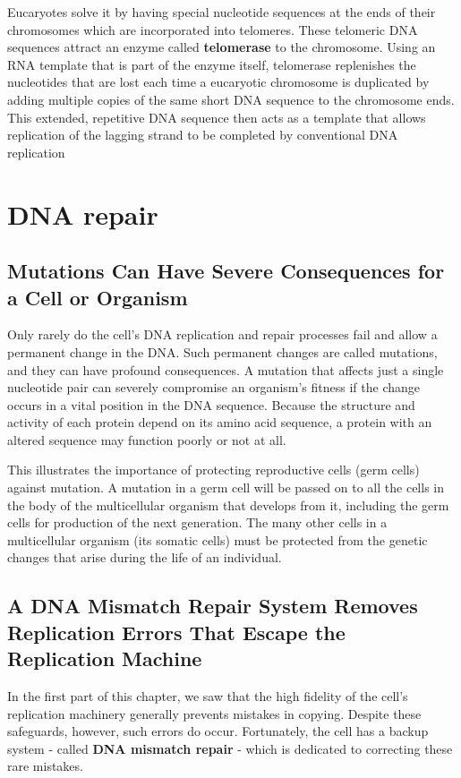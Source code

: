 Eucaryotes solve it by having special nucleotide
sequences at the ends of their chromosomes which are incorporated
into telomeres. These telomeric DNA sequences attract an enzyme called
\textbf{telomerase} to the chromosome. Using an RNA template that is part of
the enzyme itself, telomerase replenishes the nucleotides that are lost
each time a eucaryotic chromosome is duplicated by adding multiple
copies of the same short DNA sequence to the chromosome ends. This
extended, repetitive DNA sequence then acts as a template that allows
replication of the lagging strand to be completed by conventional DNA
replication


\section{DNA repair}

\subsection{Mutations Can Have Severe Consequences for a Cell or Organism}

Only rarely do the cell’s DNA replication and repair processes fail and
allow a permanent change in the DNA. Such permanent changes are
called mutations, and they can have profound consequences. A mutation
that affects just a single nucleotide pair can severely compromise
an organism’s fitness if the change occurs in a vital position in the DNA
sequence. Because the structure and activity of each protein depend on
its amino acid sequence, a protein with an altered sequence may function
poorly or not at all.

This illustrates the importance of protecting reproductive cells (germ cells) against
mutation. A mutation in a germ cell will be passed on to all the cells in
the body of the multicellular organism that develops from it, including the
germ cells for production of the next generation.
The many other cells in a multicellular organism (its somatic cells) must
be protected from the genetic changes that arise during the life of an
individual.

\subsection{A DNA Mismatch Repair System Removes Replication Errors That Escape the Replication Machine}

In the first part of this chapter, we saw that the high fidelity of the cell’s
replication machinery generally prevents mistakes in copying. Despite
these safeguards, however, such errors do occur. Fortunately, the cell
has a backup system - called \textbf{DNA mismatch repair} - which is dedicated
to correcting these rare mistakes.

